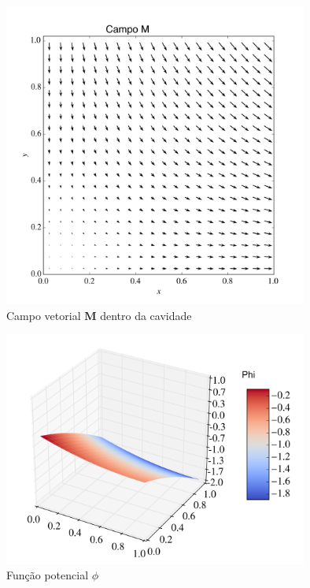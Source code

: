 \documentclass[a4paper,11pt]{article}
\begin{document}
\begin{figure}[!ht]
\centering
\includegraphics[width=10cm]{img/Mproblem3.png}
\caption{Campo vetorial $\mathbf{M}$ dentro da cavidade\label{p42}}
\end{figure}

\begin{figure}[!ht]
\centering
\includegraphics[width=10cm]{img/phiProblem3.png}
\caption{Função potencial $\phi$\label{p43}}
\end{figure}
\end{document}
